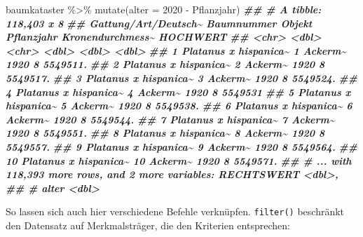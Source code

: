 \documentclass[
  ngerman,
]{article}
\newenvironment{Shaded}{\begin{snugshade}}{\end{snugshade}}
\newcommand{\AttributeTok}[1]{\textcolor[rgb]{0.77,0.63,0.00}{#1}}
\newcommand{\DecValTok}[1]{\textcolor[rgb]{0.00,0.00,0.81}{#1}}
\newcommand{\DocumentationTok}[1]{\textcolor[rgb]{0.56,0.35,0.01}{\textbf{\textit{#1}}}}
\newcommand{\FunctionTok}[1]{\textcolor[rgb]{0.00,0.00,0.00}{#1}}
\newcommand{\NormalTok}[1]{#1}
\newcommand{\SpecialCharTok}[1]{\textcolor[rgb]{0.00,0.00,0.00}{#1}}
\begin{document}
\begin{Shaded}
\begin{Highlighting}[]
\NormalTok{baumkataster }\SpecialCharTok{\%\textgreater{}\%}
  \FunctionTok{mutate}\NormalTok{(}\AttributeTok{alter =} \DecValTok{2020} \SpecialCharTok{{-}}\NormalTok{ Pflanzjahr)}
\DocumentationTok{\#\# \# A tibble: 118,403 x 8}
\DocumentationTok{\#\#    \textasciigrave{}Gattung/Art/Deutsch\textasciitilde{} Baumnummer Objekt  Pflanzjahr Kronendurchmess\textasciitilde{} HOCHWERT}
\DocumentationTok{\#\#    \textless{}chr\textgreater{}                      \textless{}dbl\textgreater{} \textless{}chr\textgreater{}        \textless{}dbl\textgreater{}            \textless{}dbl\textgreater{}    \textless{}dbl\textgreater{}}
\DocumentationTok{\#\#  1 Platanus x hispanica\textasciitilde{}          1 Ackerm\textasciitilde{}       1920                8 5549511.}
\DocumentationTok{\#\#  2 Platanus x hispanica\textasciitilde{}          2 Ackerm\textasciitilde{}       1920                8 5549517.}
\DocumentationTok{\#\#  3 Platanus x hispanica\textasciitilde{}          3 Ackerm\textasciitilde{}       1920                8 5549524.}
\DocumentationTok{\#\#  4 Platanus x hispanica\textasciitilde{}          4 Ackerm\textasciitilde{}       1920                8 5549531 }
\DocumentationTok{\#\#  5 Platanus x hispanica\textasciitilde{}          5 Ackerm\textasciitilde{}       1920                8 5549538.}
\DocumentationTok{\#\#  6 Platanus x hispanica\textasciitilde{}          6 Ackerm\textasciitilde{}       1920                8 5549544.}
\DocumentationTok{\#\#  7 Platanus x hispanica\textasciitilde{}          7 Ackerm\textasciitilde{}       1920                8 5549551.}
\DocumentationTok{\#\#  8 Platanus x hispanica\textasciitilde{}          8 Ackerm\textasciitilde{}       1920                8 5549557.}
\DocumentationTok{\#\#  9 Platanus x hispanica\textasciitilde{}          9 Ackerm\textasciitilde{}       1920                8 5549564.}
\DocumentationTok{\#\# 10 Platanus x hispanica\textasciitilde{}         10 Ackerm\textasciitilde{}       1920                8 5549571.}
\DocumentationTok{\#\# \# ... with 118,393 more rows, and 2 more variables: RECHTSWERT \textless{}dbl\textgreater{},}
\DocumentationTok{\#\# \#   alter \textless{}dbl\textgreater{}}
\end{Highlighting}
\end{Shaded}

So lassen sich auch hier verschiedene Befehle verknüpfen. \texttt{filter()} beschränkt den Datensatz auf Merkmalsträger, die den Kriterien entsprechen:
\end{document}
